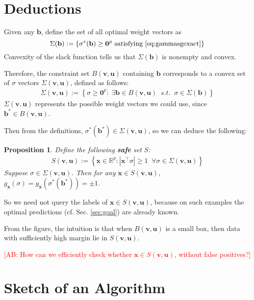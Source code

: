 \documentclass{article}
\newcommand{\vx}{\mathbf{x}}
\newcommand{\vb}{\mathbf{b}}
\newcommand{\vu}{\mathbf{u}}
\newcommand{\vv}{\mathbf{v}}
\newcommand{\vzero}{\mathbf{0}}
\newtheorem{prop}[thm]{Proposition}
\newcommand{\RR}{\mathbb{R}}      %
\newcommand{\abs}[1]{\left| #1 \right|}
\newcommand{\lrsetb}[1]{\left\{#1\right\}}
\newcommand{\authcmt}[2]{\textcolor{#1}{#2}}
\newcommand{\akshay}[1]{\authcmt{red}{[AB: #1]}}
\begin{document}
\section{Deductions}

Given any $\vb$, define the set of all optimal weight vectors as 
$$ \Sigma (\vb) := \lrsetb{ \sigma^* (\vb) \geq \vzero^p \mbox{ satisfying } \eqref{eq:gammasgexact} } $$ 
Convexity of the slack function tells us that 
$\Sigma (\vb)$ is nonempty and convex. 

Therefore, the constraint set $B (\vv,\vu)$ containing $\vb$ corresponds to a convex set of $\sigma$ vectors $\Sigma (\vv, \vu)$, defined as follows: 
\begin{align*}
\Sigma (\vv, \vu) := \lrsetb{ \sigma \geq \vzero^p : \;\exists \vb \in B (\vv,\vu) \;\;s.t.\;\; \sigma \in \Sigma (\vb)}
\end{align*}
$\Sigma (\vv, \vu)$ represents the possible weight vectors we could use, since  $\vb^* \in B (\vv,\vu)$. 

Then from the definitions, $\sigma^* (\vb^*) \in \Sigma (\vv, \vu)$, so we can deduce the following: 
\begin{prop}
\label{prop:safeset}
Define the following \textbf{safe} set $S$: 
\begin{align*}
S (\vv, \vu) := \lrsetb{ \vx \in \RR^p : \abs{ \vx^\top \sigma} \geq 1 \;\; \forall \sigma \in \Sigma (\vv, \vu) }
\end{align*}
Suppose $\sigma \in \Sigma (\vv, \vu)$. Then for any $\vx \in S (\vv, \vu)$, 
$g_{\vx} (\sigma) = g_{\vx} (\sigma^* (\vb^*)) = \pm 1$. 
\end{prop}
So we need not query the labels of $\vx \in S (\vv, \vu)$, 
because on such examples the optimal predictions (cf. Sec. \ref{sec:goal}) are already known.

From the figure, the intuition is that when $B (\vv, \vu)$ is a small box, 
then data with sufficiently high margin lie in $S (\vv, \vu)$. 

\akshay{How can we efficiently check whether $\vx \in S (\vv, \vu)$, without false positives?}


\section{Sketch of an Algorithm}
\end{document}
